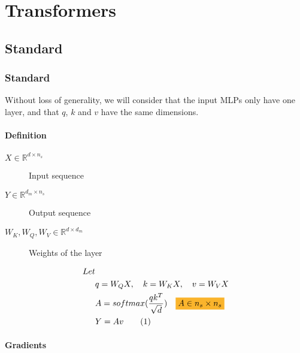 \documentclass[../main]{subfiles}
\begin{document}
\chapter{Transformers}
\section{Standard}
\subsection{Standard}
Without loss of generality, we will consider that the input MLPs only have one layer,
and that $q$, $k$ and $v$ have the same dimensions.
\subsubsection{Definition}
\begin{description}
    \item[$X \in \mathbb{R}^{d\times n_s}$] Input sequence
    \item[$Y \in \mathbb{R}^{d_m \times n_s}$] Output sequence
    \item[$W_K, W_Q, W_V \in \mathbb{R}^{d \times d_m}$] Weights of the layer
\end{description}

\begin{align*}
    Let &                                                                                      \\
        & q = W_Q X, \quad k = W_K X, \quad v = W_V X                                          \\
        & A = softmax(\frac{qk^T}{\sqrt{d}}) \quad \highlight[Dandelion]{A \in n_s \times n_s} \\
        & Y = Av \label{eq:transformer} \tag{1}
\end{align*}


\subsubsection{Gradients}
\end{document}
